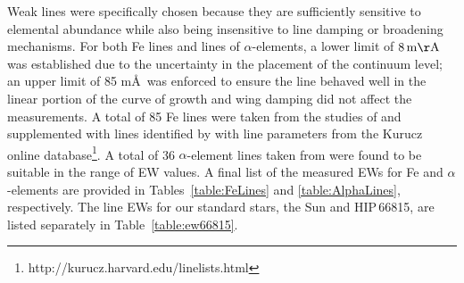 \documentclass[revtex4]{emulateapj}
\begin{document}
Weak lines were specifically chosen because they are sufficiently sensitive to elemental abundance while also being insensitive to line damping or broadening mechanisms.  For both Fe lines and lines of $\alpha$-elements, a lower limit of $8\,\mathrm{m\AA}$ was established due to the uncertainty in the placement of the continuum level; an upper limit of 85 m\AA\ was enforced to ensure the line behaved well in the linear portion of the curve of growth and wing damping did 
not affect the measurements.  A total of 85 Fe lines were taken from the studies of \citet{McWR1994} and \citet{McW1995} supplemented with lines identified by \citet{NBS61} with line parameters from the Kurucz online database\footnote{http://kurucz.harvard.edu/linelists.html}.  A total of 36 $\alpha$-element lines taken from \citet{Fulb2007} were found to be suitable in the range of EW values.  A final list of the measured EWs for Fe and $\alpha$-elements are provided in Tables~\ref{table:FeLines} and \ref{table:AlphaLines}, respectively.  The line EWs for our standard stars, the Sun and HIP\,66815, are listed separately in Table~\ref{table:ew66815}.
\end{document}
